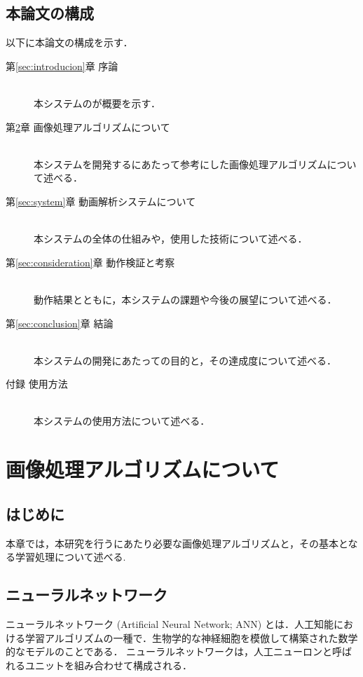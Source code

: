 \documentclass[a4j,12pt,dvipdfmx]{jreport}
\begin{document}
\section{本論文の構成}
以下に本論文の構成を示す．
\begin{description}
\item[第\ref{sec:introducion}章 \qquad 序論]\mbox{}\\
本システムのが概要を示す．

\item[第\ref{sec:algorithm}章 \qquad 画像処理アルゴリズムについて]\mbox{}\\
本システムを開発するにあたって参考にした画像処理アルゴリズムについて述べる．

\item[第\ref{sec:system}章 \qquad 動画解析システムについて]\mbox{}\\
本システムの全体の仕組みや，使用した技術について述べる．

\item[第\ref{sec:consideration}章 \qquad 動作検証と考察]\mbox{}\\
動作結果とともに，本システムの課題や今後の展望について述べる．

\item[第\ref{sec:conclusion}章 \qquad 結論]\mbox{}\\
本システムの開発にあたっての目的と，その達成度について述べる．

\item[付録 \qquad 使用方法]\mbox{}\\
本システムの使用方法について述べる．
\end{description}

\clearpage

\chapter{画像処理アルゴリズムについて}
\label{sec:algorithm}

\section{はじめに}
本章では，本研究を行うにあたり必要な画像処理アルゴリズムと，その基本となる学習処理について述べる.

\section{ニューラルネットワーク}
ニューラルネットワーク (Artificial Neural Network; ANN) とは．人工知能における学習アルゴリズムの一種で．生物学的な神経細胞を模倣して構築された数学的なモデルのことである．
ニューラルネットワークは，人工ニューロンと呼ばれるユニットを組み合わせて構成される．
\end{document}
